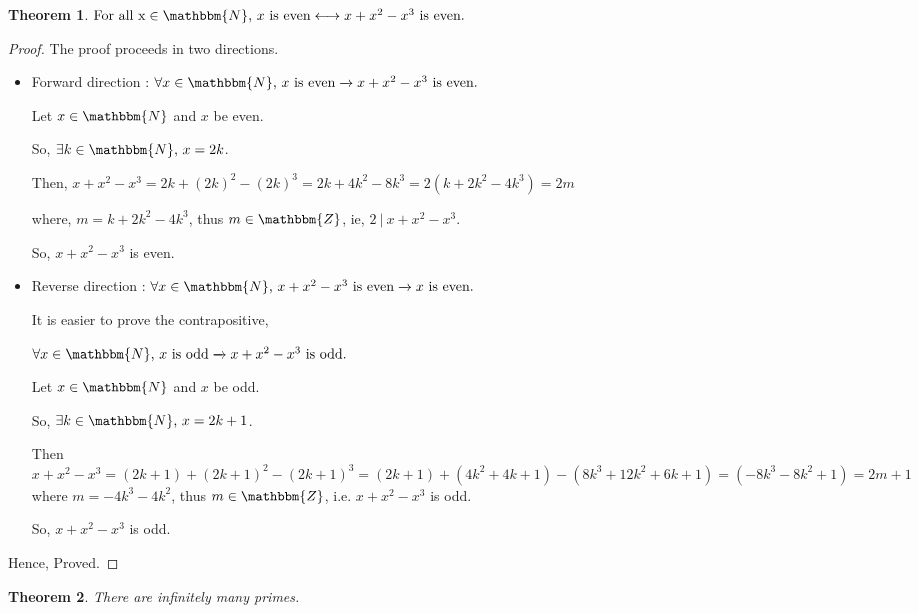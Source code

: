 \documentclass[14pt]{extarticle}
\newcommand{\impl}{\xrightarrow{}}
\newcommand{\ifff}{\longleftrightarrow}
\newcommand{\N}{\mathbbm{N}}
\newcommand{\Z}{\mathbbm{Z}}
\newtheorem{theorem}{Theorem}
\begin{document}
\begin{theorem}
$\text{For all x} \in \N\text{, } x \text{ is even} \ifff x + x^2 - x^3 \text{ is even.}$
\end{theorem}

\begin{proof}
The proof proceeds in two directions.

\begin{itemize}
    \item Forward direction : $\forall x \in \N \text{, } x \text{ is even} \impl x + x^2 - x^3 \text{ is even.} $

    Let $x \in \N$ and $x$ be even.
    
    So, $\exists k \in \N \text{, } x=2k$.

    Then, 
    $x + x^2 - x^3 = 2k + (2k)^2 - (2k)^3 = 2k + 4k^2 - 8k^3 = 2(k + 2k^2 - 4k^3) = 2m$

    where, $m = k + 2k^2 - 4k^3$, thus $m \in \Z$, ie, $2 \ | \ x + x^2 - x^3$.

    So, $x + x^2 - x^3$ is even.
    
    \item Reverse direction : $\forall x \in \N \text{, } x + x^2 - x^3 \text{ is even} \impl x \text{ is even.}$

    It is easier to prove the contrapositive,

    $\forall x \in \N \text{, } x \text{ is odd} \impl x + x^2 - x^3 \text{ is odd.} $

    Let $x \in \N$ and $x$ be odd.
    
    So, $\exists k \in \N \text{, } x=2k+1$.

    Then $x + x^2 - x^3 = (2k+1) + (2k+1)^2 - (2k+1)^3 = (2k+1) + (4k^2+4k+1) - (8k^3 + 12k^2 + 6k + 1) = (-8k^3-8k^2+1) = 2m+1$ where $m = -4k^3-4k^2$, thus $m \in \Z$, i.e. $x + x^2 - x^3$ is odd.

    So, $x + x^2 - x^3$ is odd.
\end{itemize}

Hence, Proved.
\end{proof}

\begin{theorem}
    There are infinitely many primes.
\end{theorem}
\end{document}
